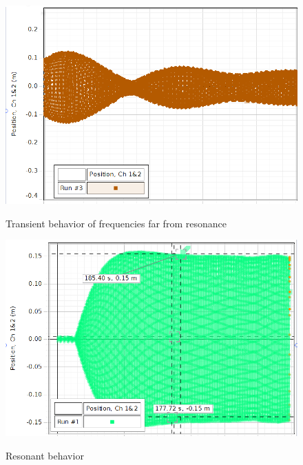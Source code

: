 \documentclass[twocolumn,english]{IEEEtran}
\theoremstyle{plain}
\theoremstyle{plain}
\begin{document}
\begin{figure}[h!]
  \begin{centering}
  \begin{center}
  \includegraphics[width=\linewidth]{./Images/transcience.png}
  \label{fig:transcience}
  \caption{Transient behavior of frequencies far from resonance}
  \end{center}
  \par\end{centering}
  \end{figure}
\appendices{}

\begin{figure}[h!]
  \begin{centering}
  \begin{center}
  \includegraphics[width=\linewidth]{./Images/resonance.png}
  \label{fig:resonance}
  \caption{Resonant behavior}
  \end{center}
  \par\end{centering}
  \end{figure}
\appendices{}
\end{document}
